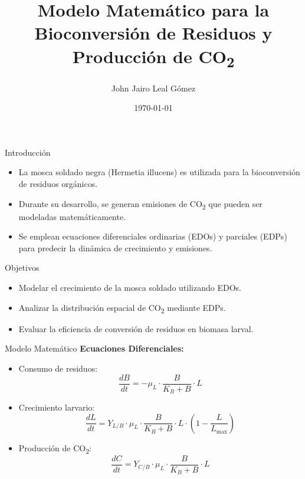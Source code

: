 \documentclass{beamer}
\title{Modelo Matemático para la Bioconversión de Residuos y Producción de CO\textsubscript{2}}
\author{John Jairo Leal Gómez}
\date{\today}
\begin{document}
\frame{\titlepage}

\begin{frame}{Introducción}
    \begin{itemize}
        \item La mosca soldado negra (Hermetia illucens) es utilizada para la bioconversión de residuos orgánicos.
        \item Durante su desarrollo, se generan emisiones de CO\textsubscript{2} que pueden ser modeladas matemáticamente.
        \item Se emplean ecuaciones diferenciales ordinarias (EDOs) y parciales (EDPs) para predecir la dinámica de crecimiento y emisiones.
    \end{itemize}
\end{frame}

\begin{frame}{Objetivos}
    \begin{itemize}
        \item Modelar el crecimiento de la mosca soldado utilizando EDOs.
        \item Analizar la distribución espacial de CO\textsubscript{2} mediante EDPs.
        \item Evaluar la eficiencia de conversión de residuos en biomasa larval.
    \end{itemize}
\end{frame}

\begin{frame}{Modelo Matemático}
    \textbf{Ecuaciones Diferenciales:}
    \begin{itemize}
        \item Consumo de residuos:
        \begin{equation}
            \frac{dB}{dt} = -\mu_L \cdot \frac{B}{K_B + B} \cdot L
        \end{equation}
        \item Crecimiento larvario:
        \begin{equation}
            \frac{dL}{dt} = Y_{L/B} \cdot \mu_L \cdot \frac{B}{K_B + B} \cdot L \cdot \left(1 - \frac{L}{L_{\text{max}}}\right)
        \end{equation}
        \item Producción de CO\textsubscript{2}:
        \begin{equation}
            \frac{dC}{dt} = Y_{C/B} \cdot \mu_L \cdot \frac{B}{K_B + B} \cdot L
        \end{equation}
    \end{itemize}
\end{frame}
\end{document}
